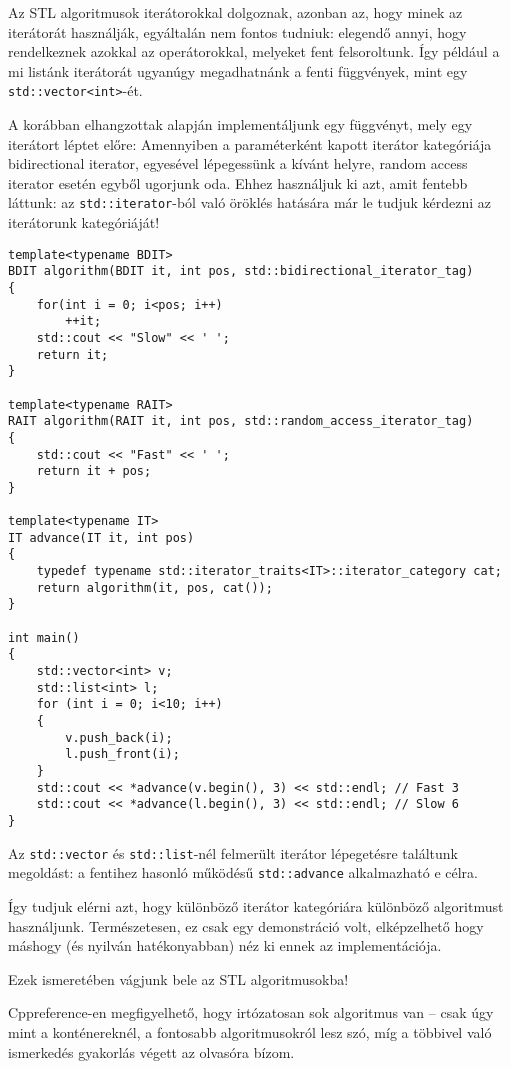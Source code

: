 \documentclass[a4paper,11.5pt,table]{article}
\begin{document}
	Az STL algoritmusok iterátorokkal dolgoznak, azonban az, hogy minek az iterátorát használják, egyáltalán nem fontos tudniuk: elegendő annyi, hogy rendelkeznek azokkal az operátorokkal, melyeket fent felsoroltunk. Így például a mi listánk iterátorát ugyanúgy megadhatnánk a fenti függvények, mint egy \texttt{std::vector<int>}-ét.
	
	\medskip
	A korábban elhangzottak alapján implementáljunk egy függvényt, mely egy iterátort léptet előre: Amennyiben a paraméterként kapott iterátor kategóriája bidirectional iterator, egyesével lépegessünk a kívánt helyre, random access iterator esetén egyből ugorjunk oda.  Ehhez használjuk ki azt, amit fentebb láttunk: az \texttt{std::iterator}-ból való öröklés hatására már le tudjuk kérdezni az iterátorunk kategóriáját!
	\begin{lstlisting}
template<typename BDIT> 
BDIT algorithm(BDIT it, int pos, std::bidirectional_iterator_tag) 
{
	for(int i = 0; i<pos; i++)
		++it;
	std::cout << "Slow" << ' ';
	return it;
}

template<typename RAIT>
RAIT algorithm(RAIT it, int pos, std::random_access_iterator_tag) 
{
	std::cout << "Fast" << ' ';
	return it + pos;
}

template<typename IT> 
IT advance(IT it, int pos) 
{
	typedef typename std::iterator_traits<IT>::iterator_category cat;
	return algorithm(it, pos, cat());
}

int main() 
{
	std::vector<int> v;
	std::list<int> l;
	for (int i = 0; i<10; i++)
	{
		v.push_back(i);
		l.push_front(i);
	}
	std::cout << *advance(v.begin(), 3) << std::endl; // Fast 3
	std::cout << *advance(l.begin(), 3) << std::endl; // Slow 6
}  
	\end{lstlisting}
	\begin{note}
		Az \texttt{std::vector} és \texttt{std::list}-nél felmerült iterátor lépegetésre találtunk megoldást: a fentihez hasonló működésű \texttt{std::advance} alkalmazható e célra.
	\end{note}
	Így tudjuk elérni azt, hogy különböző iterátor kategóriára különböző algoritmust használjunk. Természetesen, ez csak egy demonstráció volt, elképzelhető hogy máshogy (és nyilván hatékonyabban) néz ki ennek az implementációja.
	\medskip
	
	Ezek ismeretében vágjunk bele az STL algoritmusokba!
	\begin{note}
		Cppreference-en megfigyelhető, hogy irtózatosan sok algoritmus van -- csak úgy mint a konténereknél, a fontosabb algoritmusokról lesz szó, míg a többivel való ismerkedés gyakorlás végett az olvasóra bízom.
	\end{note}
\end{document}
